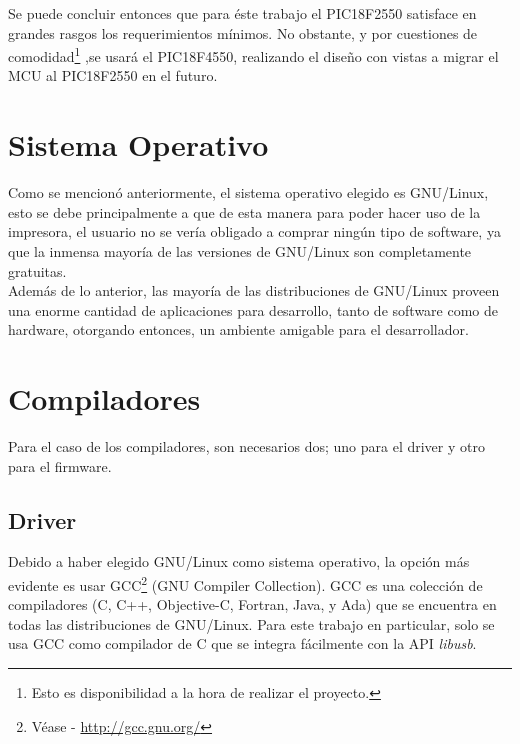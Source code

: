 Se puede concluir entonces que para \'este trabajo el PIC18F2550 satisface en
grandes rasgos los requerimientos m\'inimos. No obstante, y por cuestiones de
comodidad\footnote{Esto es disponibilidad a la hora de realizar el proyecto.}
,se usar\'a el PIC18F4550, realizando el dise\~no con vistas a migrar el MCU
al PIC18F2550 en el futuro.\\

\section{Sistema Operativo} %
Como se mencion\'o anteriormente, el sistema operativo elegido es GNU/Linux,
esto se debe principalmente a que de esta manera para poder hacer uso de la
impresora, el usuario no se ver\'ia obligado a comprar ning\'un tipo de
software,
ya que la inmensa mayor\'ia de las versiones de GNU/Linux son completamente
gratuitas.\\

Adem\'as de lo anterior, las mayor\'ia de las distribuciones de GNU/Linux
proveen una enorme cantidad de aplicaciones para desarrollo, tanto de software
como de hardware, otorgando entonces, un ambiente amigable para el
desarrollador.\\

\section{Compiladores} %
Para el caso de los compiladores, son necesarios dos; uno para el driver y
otro para el firmware.\\

\subsection{Driver}
Debido a haber elegido GNU/Linux como sistema operativo, la opci\'on m\'as
evidente es usar GCC\footnote{V\'ease - \url{http://gcc.gnu.org/}} (GNU
Compiler Collection). GCC es una colecci\'on de compiladores (C, C++,
Objective-C, Fortran, Java, y Ada) que se encuentra en todas las distribuciones
de GNU/Linux. Para este trabajo en particular, solo se usa GCC como compilador
de C que se integra f\'acilmente con la API \emph{libusb}.

